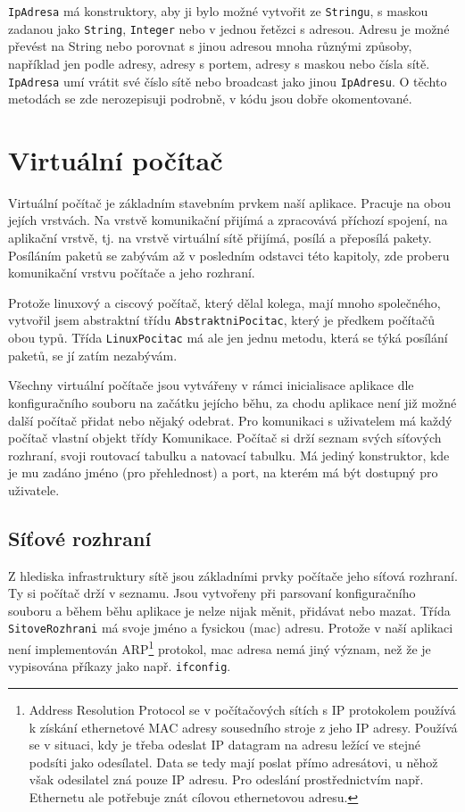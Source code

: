 \verb|IpAdresa| má konstruktory, aby ji bylo možné vytvořit ze \verb|Stringu|, s maskou zadanou jako \verb|String|, \verb|Integer| nebo v jednou řetězci s adresou. Adresu je možné převést na String nebo porovnat s jinou adresou mnoha různými způsoby, například jen podle adresy, adresy s portem,  adresy s maskou nebo čísla sítě. \verb|IpAdresa| umí vrátit své číslo sítě nebo broadcast jako jinou \verb|IpAdresu|. O těchto metodách se zde nerozepisuji podrobně, v kódu jsou dobře okomentované.




\section{Virtuální počítač}

Virtuální počítač je základním stavebním prvkem naší aplikace. Pracuje na obou jejích vrstvách. Na vrstvě komunikační přijímá a zpracovává příchozí spojení, na aplikační vrstvě, tj. na vrstvě virtuální sítě přijímá, posílá a přeposílá pakety. Posíláním paketů se zabývám až v posledním odstavci této kapitoly, zde proberu komunikační vrstvu počítače a jeho rozhraní.

Protože linuxový a ciscový počítač, který dělal kolega, mají mnoho společného, vytvořil jsem abstraktní třídu \verb|AbstraktniPocitac|, který je předkem počítačů obou typů. Třída \verb|LinuxPocitac| má ale jen jednu metodu, která se týká posílání paketů, se jí zatím nezabývám.

Všechny virtuální počítače jsou vytvářeny v rámci inicialisace aplikace dle konfiguračního souboru na začátku jejícho běhu, za chodu aplikace není již možné další počítač přidat nebo nějaký odebrat. Pro komunikaci s uživatelem má každý počítač vlastní objekt třídy Komunikace. Počítač si drží seznam svých síťových rozhraní, svoji routovací tabulku a natovací tabulku. Má jediný konstruktor, kde je mu zadáno jméno (pro přehlednost) a port, na kterém má být dostupný pro uživatele.


\subsection{Síťové rozhraní}

Z hlediska infrastruktury sítě jsou základními prvky počítače jeho síťová rozhraní. Ty si počítač drží v seznamu. Jsou vytvořeny při parsovaní konfiguračního souboru a během běhu aplikace je nelze nijak měnit, přidávat nebo mazat. Třída \verb|SitoveRozhrani| má svoje jméno a fysickou (mac) adresu. Protože v naší aplikaci není implementován ARP\footnote{Address Resolution Protocol se v počítačových sítích s IP protokolem používá k získání ethernetové MAC adresy sousedního stroje z jeho IP adresy. Používá se v situaci, kdy je třeba odeslat IP datagram na adresu ležící ve stejné podsíti jako odesílatel. Data se tedy mají poslat přímo adresátovi, u něhož však odesilatel zná pouze IP adresu. Pro odeslání prostřednictvím např. Ethernetu ale potřebuje znát cílovou ethernetovou adresu.\cite{wiki:arp}} protokol, mac adresa nemá jiný význam, než že je vypisována příkazy jako např. \verb|ifconfig|.

